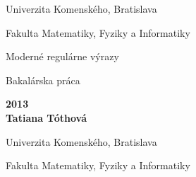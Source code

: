 \documentclass[a4paper,12pt,openany,oneside]{scrbook} %
\renewcommand\baselinestretch{1.3} %
\def\mftitle{Moderné regulárne výrazy}
\def\mfthesistype{Bakalárska práca}
\def\mfauthor{Tatiana Tóthová}
\def\mfadvisor{RNDr. Michal Forišek, PhD.}
\def\mfdate{2013}
\def\mfuniversity{Univerzita Komenského, Bratislava}
\def\mffakulta{Fakulta Matematiky, Fyziky a Informatiky}
\begin{document}
\frontmatter

\thispagestyle{empty}

\noindent
\begin{center}
\begin{minipage}{0.8\textwidth}
\centerline{\renewcommand\baselinestretch{1.3} \LARGE\sc\mfuniversity}
\centerline{\sc\mffakulta}
\end{minipage}
\end{center}

\vfill
\begin{center}
\begin{minipage}{1\textwidth}
\bigskip\bigskip
\begin{center}
\linespread{1}\LARGE\sc\mftitle
\end{center}
\smallskip
\centerline{\mfthesistype}
\bigskip
\bigskip
\bigskip\bigskip
\end{minipage}
\end{center}
\vfill
{\bf\mfdate \\
\indent\mfauthor}
\eject %


\thispagestyle{empty}

\noindent
\begin{center}
\begin{minipage}{0.8\textwidth}
\centerline{\LARGE\sc\mfuniversity}
\centerline{\sc\mffakulta}
\end{minipage}
\end{center}
\end{document}
